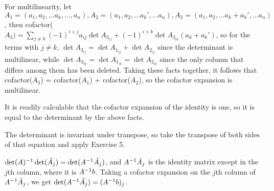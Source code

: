 \documentclass[11pt, oneside]{article}   	%
\begin{document}
For multilinearity, let $A_1 = (a_1, a_2, \ldots a_k, \ldots, a_n), A_2 = (a_1, a_2 ,\ldots a_{k}', \ldots a_n), A_3 = (a_1, a_2 ,\ldots a_k + a_{k}', \ldots a_n)$, then cofactor($A_3) = \sum_{j \not = k} (-1)^{i + j}a_{ij}\det A_{3_{ij}} + (-1)^{i + k}\det A_{3_{ik}}(a_k + a_k')$, so for the terms with $j \not = k$, $\det A_{3_{ij}} = \det A_{1_{ij}} + \det A_{2_{ij}}$ since the determinant is multilinear, while $\det A_{3_{ik}} = \det A_{1_{ik}} = \det A_{2_{ik}}$ since the only column that differs among them has been deleted. Taking these facts together, it follows that cofactor($A_3$) = cofactor($A_1$) + cofactor($A_2$), so the cofactor expansion is multilinear.

It is readily calculable that the cofactor expansion of the identity is one, so it is equal to the determinant by the above facts.
\item The determinant is invariant under transpose, so take the transpose of both sides of that equation and apply Exercise 5.
\item $\det(A)^{-1} \det(\tilde{A_j}) = \det(A^{-1} \tilde{A_j})$, and $A^{-1} \tilde{A_j}$ is the identity matrix except in the $j$th column, where it is $A^{-1} b$. Taking a cofactor expansion on the $j$th column of $A^{-1} \tilde{A_j}$, we get $\det(A^{-1} \tilde{A_j}) = (A^{-1} b)_j$. 
\ee
\end{document}
